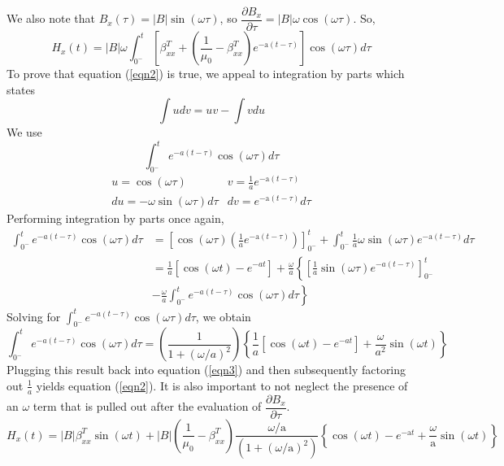 \documentclass[12pt]{article}
\begin{document}
We also note that $B_x(\tau) = |B|\sin(\omega \tau) $, so $\dfrac{\partial B_x}{\partial\tau} = |B|\omega\cos(\omega\tau)$. So,
$$
H_{x}(t)=|B|\omega\int_{0^{-}}^{t}\left[\beta_{x x}^{T}+\left(\frac{1}{\mu_{0}}-\beta_{x x}^{T}\right) e^{-\mathrm{a}(t-\tau)}\right]\cos(\omega\tau)d \tau
$$
To prove that equation (\ref{eqn2}) is true, we appeal to integration by parts which states
$$\int udv = uv - \int vdu $$
We use
$$\int_{0^-}^{t}e^{-a(t - \tau)}\cos(\omega\tau)d\tau $$
\begin{equation*}
    \begin{array}{cc}
u=\cos (\omega \tau) & v=\frac{1}{a} e^{-\mathrm{a}(t-\tau)} \\
d u=-\omega \sin (\omega \tau) d \tau & d v=e^{-\mathrm{a}(t-\tau)} d \tau
\end{array}
\end{equation*}
Performing integration by parts once again, 
$$
\begin{aligned}
    \int_{0^-}^{t}e^{-a(t - \tau)}\cos(\omega\tau)d\tau &= \left[\cos (\omega \tau)\left(\frac{1}{a} e^{-\mathrm{a}(t-\tau)}\right)\right]_{0^-}^{t} + \int_{0^-}^{t} \frac{1}{a}\omega \sin (\omega \tau)   e^{-\mathrm{a}(t-\tau)}d \tau \\
    &= \frac{1}{a}\left[\cos(\omega t) - e^{-at}\right] + \frac{\omega}{a}\left\{ \left[\frac{1}{a}\sin(\omega\tau)e^{-a(t - \tau)} \right]_{0^-}^{t} \right.\\
    &- \left.\frac{\omega}{a}\int_{0^-}^{t}e^{-a(t - \tau)}\cos(\omega\tau)d\tau\right\} 
\end{aligned}
$$
Solving for $\int_{0^-}^{t}e^{-a(t - \tau)}\cos(\omega\tau)d\tau$, we obtain
$$\int_{0^-}^{t}e^{-a(t - \tau)}\cos(\omega \tau)d\tau = \left(\frac{1}{1 + (\omega / a)^2} \right)\left\{\frac{1}{a}\left[\cos(\omega t) - e^{-at} \right] + \frac{\omega}{a^2}\sin(\omega t)\right\}$$
Plugging this result back into equation (\ref{eqn3}) and then subsequently factoring out $\frac{1}{a}$ yields equation (\ref{eqn2}). It is also important to not neglect the presence of an $\omega$ term that is pulled out after the evaluation of $\dfrac{\partial B_x}{\partial \tau}$.
$$H_x(t) = |B|\beta_{xx}^{T}\sin(\omega t) + |B|\left(\frac{1}{\mu_0} - \beta_{xx}^T \right)\frac{\omega/\text{a}}{\left( 1 + (\omega/\text{a})^2\right)}\left\{\cos(\omega t) - e^{-\text{a}t} + \frac{\omega}{\text{a}}\sin(\omega t) \right\}$$
\end{document}
